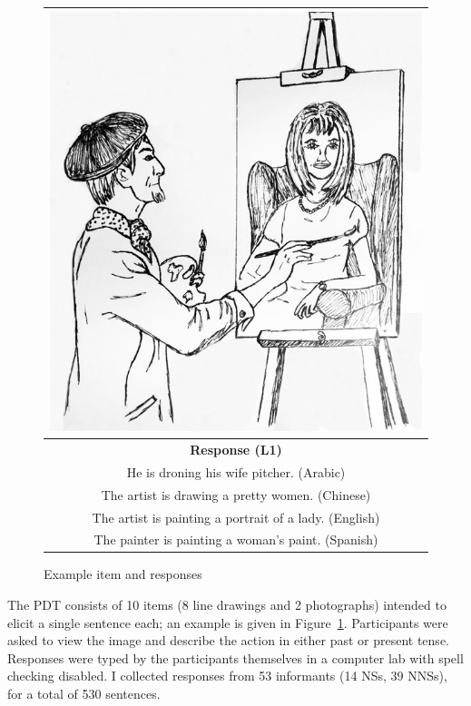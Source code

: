 \begin{figure}[htb!]
\begin{center}
\begin{tabular}{|c|}
\hline
\includegraphics[width=0.8\columnwidth]{figures/exampleprompt.jpg}\\
\hline
\textbf{Response (L1)} \\
\hline
He is droning his wife pitcher. (Arabic)\\
\hline
The artist is drawing a pretty women. (Chinese) \\
\hline
The artist is painting a portrait of a lady. (English) \\
\hline
The painter is painting a woman's paint. (Spanish)\\
\hline
\end{tabular}
\end{center}
\caption{Example item and responses}
\label{fig:example-picture}
\end{figure}

The PDT consists of 10 items (8 line drawings and 2 photographs) intended to elicit a single sentence each; an example is given in Figure~\ref{fig:example-picture}. Participants
were asked to view the image and describe the action in either past or present tense. Responses were typed by the participants themselves in a computer lab with spell checking disabled.
I collected responses from 53
informants (14 NSs, 39 NNSs), for a total of 530 sentences. 

